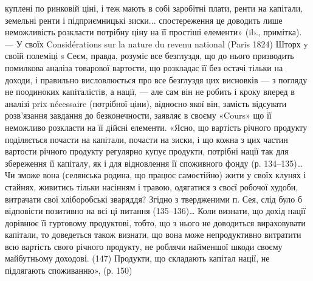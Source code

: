 куплені по ринковій ціні, і теж мають в собі заробітні плати, ренти на капітали, земельні ренти і
підприємницькі зиски... спостереження це доводить лише неможливість розкласти потрібну ціну на її
простіші елементи» (ib., примітка). — У своїх Considérations sur la nature du revenu national (Paris
1824)
Шторх y своїй полеміці s Сеєм, правда, розуміє все безглуздя, що до нього призводить помилкова
аналіза товарової вартости, що розкладає її без остачі тільки на доходи, і правильно висловлюється
про все безглуздя цих висновків — з погляду не поодиноких капіталістів, а нації, — але сам він не
робить і кроку вперед в аналізі prix nécessaire (потрібної ціни), відносно якої він, замість
відсувати розв’язання
завдання до безконечности, заявляє в своєму «Cours» що її неможливо розкласти на її дійсні елементи.
«Ясно, що вартість річного продукту поділяється почасти на капітали, почасти на зиски, і що кожна з
цих частин вартости річного продукту регулярно купує продукти, потрібні нації так для збереження її
капіталу, як і для відновлення її споживного фонду (р. 134--135)\dots{} Чи зможе вона (селянська родина,
що працює самостійно) жити у своїх клунях і стайнях, живитись тільки насінням
і травою, одягатися з своєї робочої худоби, витрачати свої хліборобські зваряддя? Згідно з
твердженими п. Сея, слід було б відповісти позитивно на всі ці питання (135--136)\dots{} Коли визнати, що
дохід нації дорівнює її гуртовому продуктові, тобто, що з нього не доводиться вираховувати капітали,
то доведеться також визнати, що вона може непродуктивно витратити всю вартість свого річного
продукту,
не роблячи найменшої шкоди своєму майбутньому доходові. (147) Продукти, що складають капітал нації,
не підлягають споживанню», (р. 150)
\parbreak{}  %
